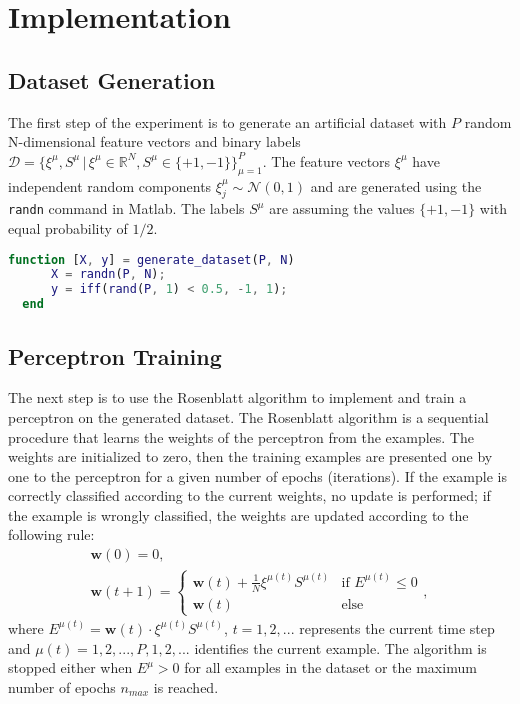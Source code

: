 \section{Implementation}

\subsection{Dataset Generation}
The first step of the experiment is to generate an artificial dataset with $P$ random N-dimensional feature vectors and binary labels $\mathcal{D} = \{ \xi^\mu, S^\mu \,|\, \xi^\mu \in \mathds{R}^N, S^\mu \in \{+1, -1\} \}_{\mu=1}^P$.
The feature vectors $\xi^\mu$ have independent random components $\xi_j^\mu \sim \mathcal{N}(0, 1)$ and are generated using the \texttt{randn} command in Matlab.
The labels $S^\mu$ are assuming the values $\{+1, -1\}$ with equal probability of $1/2$.

\begin{lstlisting}[language=Matlab]
  function [X, y] = generate_dataset(P, N)
      X = randn(P, N);
      y = iff(rand(P, 1) < 0.5, -1, 1);
  end
\end{lstlisting}

\subsection{Perceptron Training}
The next step is to use the Rosenblatt algorithm to implement and train a perceptron on the generated dataset.
The Rosenblatt algorithm is a sequential procedure that learns the weights of the perceptron from the examples.
The weights are initialized to zero, then the training examples are presented one by one to the perceptron for a given number of epochs (iterations).
If the example is correctly classified according to the current weights, no update is performed;
if the example is wrongly classified, the weights are updated according to the following rule:
\begin{gather} 
    \mathsf{\bm{w}}(0) = 0, \\
    \mathsf{\bm{w}}(t + 1) =
        \begin{cases}
            \mathsf{\bm{w}}(t) + \frac{1}{N} \xi^{\mu(t)} S^{\mu(t)} &\text{if $E^{\mu(t)} \leq 0$}\\
            \mathsf{\bm{w}}(t) &\text{else}
        \end{cases},
    \label{eq:update-rule}
\end{gather}
where $E^{\mu(t)} = \mathsf{\bm{w}}(t) \cdot \xi^{\mu(t)} S^{\mu(t)}$, $t = 1, 2, ...$ represents the current time step and $\mu(t) = 1, 2, ..., P, 1, 2, ...$ identifies the current example.
The algorithm is stopped either when $E^\mu > 0$ for all examples in the dataset or the maximum number of epochs $n_{max}$ is reached.

